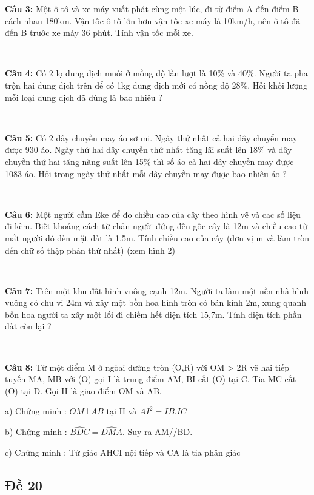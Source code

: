 \documentclass[12pt]{article}
\begin{document}
\textbf{Câu 3:} Một ô tô và xe máy xuất phát cùng một lúc, đi từ điểm A đến điểm B cách nhau 180km. Vận tốc ô tố lớn hơn vận tốc xe máy là 10km/h, nên ô tô đã đến B trước xe máy 36 phút. Tính vận tốc mỗi xe. \par

\    

\textbf{Câu 4:} Có 2 lọ dung dịch muối ở mồng độ lần lượt là 10\% và 40\%. Người ta pha trộn hai dung dịch trên để có 1kg dung dịch mới có nồng độ 28\%. Hỏi khối lượng mỗi loại dung dịch đã dùng là bao nhiêu ? \par

\   

\textbf{Câu 5:} Có 2 dây chuyền may áo sơ mi. Ngày thứ nhất cả hai dây chuyển may được 930 áo. Ngày thứ hai dây chuyền thứ nhất tăng lãi suất lên 18\% và dây chuyền thứ hai tăng năng suất lên 15\% thì số áo cả hai dây chuyền may được 1083 áo. Hỏi trong ngày thứ nhất mỗi dây chuyền may được bao nhiêu áo ?

\   

\textbf{Câu 6:} Một người cầm Eke để đo chiều cao của cây theo hình vẽ và cac số liệu đi kèm. Biết khoảng cách từ chân người đứng đến gốc cây là 12m và chiều cao từ mắt người đó đến mặt đất là 1,5m. Tính chiều cao của cây (đơn vị m và làm tròn đến chữ số thập phân thứ nhất) (xem hình 2) \par

\   

\textbf{Câu 7:} Trên một khu đất hình vuông cạnh 12m. Người ta làm một nền nhà hình vuông có chu vi 24m và xây một bồn hoa hình tròn có bán kính 2m, xung quanh bồn hoa người ta xây một lối đi chiếm hết diện tích 15,7m. Tính diện tích phần đất còn lại ? \par

\   

\textbf{Câu 8:} Từ một điểm M ở ngòai đường tròn (O,R) với OM > 2R vẽ hai tiếp tuyến MA, MB với  (O) gọi I là trung điểm AM, BI cắt (O) tại C. Tia MC cắt (O) tại D. Gọi H là giao điểm OM và AB. \par
a) Chứng minh : $OM \bot AB$ tại H và $AI^2 = IB.IC$ \par
b) Chứng minh : $\widehat{BDC} = \widehat{DMA}$. Suy ra AM//BD. \par
c) Chứng minh :  Tứ giác AHCI nội tiếp và CA là tia phân giác 

\break

\subsection{Đề 20}
\end{document}
